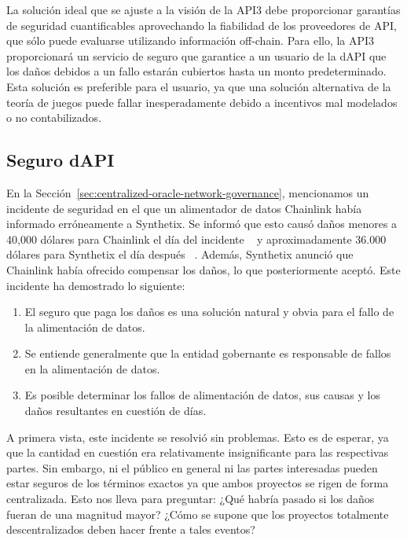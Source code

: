 \documentclass[11pt]{article}
\begin{document}
La solución ideal que se ajuste a la visión de la API3 debe proporcionar garantías de seguridad cuantificables aprovechando la fiabilidad de los proveedores de API, que sólo puede evaluarse utilizando información off-chain. Para ello, la API3 proporcionará un servicio de seguro que garantice a un usuario de la dAPI que los daños debidos a un fallo estarán cubiertos hasta un monto predeterminado. Esta solución es preferible para el usuario, ya que una solución alternativa de la teoría de juegos puede fallar inesperadamente debido a incentivos mal modelados o no contabilizados.

\subsection{Seguro dAPI}
\label{sec:dapi-insurance}

En la Sección~\ref{sec:centralized-oracle-network-governance}, mencionamos un incidente de seguridad en el que un alimentador de datos Chainlink había informado erróneamente a Synthetix. Se informó que esto causó daños menores a 40,000 dólares para Chainlink el día del incidente ~\cite{chainlink-fatfinger} y aproximadamente 36.000 dólares para Synthetix el día después ~\cite{synthetix-fatfinger}.
Además, Synthetix anunció que Chainlink había ofrecido compensar los daños, lo que posteriormente aceptó. Este incidente ha demostrado lo siguiente:

\begin{enumerate}
    \item El seguro que paga los daños es una solución natural y obvia para el fallo de la alimentación de datos.
    \item Se entiende generalmente que la entidad gobernante es responsable de fallos en la alimentación de datos.
    \item Es posible determinar los fallos de alimentación de datos, sus causas y los daños resultantes en cuestión de días.
\end{enumerate}

A primera vista, este incidente se resolvió sin problemas. Esto es de esperar, ya que la cantidad en cuestión era relativamente insignificante para las respectivas partes. Sin embargo, ni el público en general ni las partes interesadas pueden estar seguros de los términos exactos ya que ambos proyectos se rigen de forma centralizada. Esto nos lleva para preguntar: ¿Qué habría pasado si los daños fueran de una magnitud mayor? ¿Cómo se supone que los proyectos totalmente descentralizados deben hacer frente a tales eventos?
\end{document}
